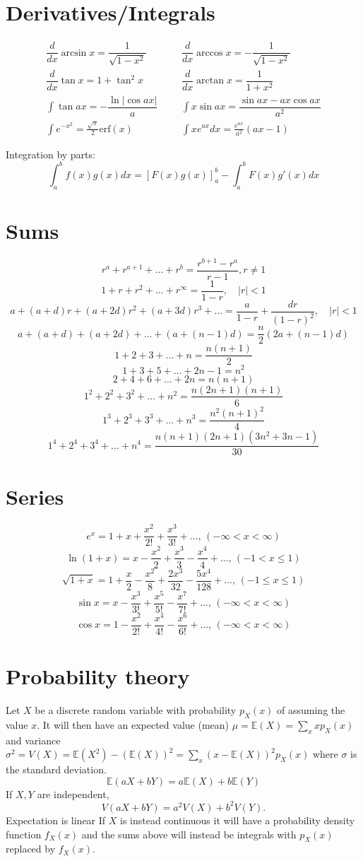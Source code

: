\section{Derivatives/Integrals}
\begin{align*}
	\dfrac{d}{dx}\arcsin x = \dfrac{1}{\sqrt{1-x^2}} &&& \dfrac{d}{dx}\arccos x = -\dfrac{1}{\sqrt{1-x^2}} \\
	\dfrac{d}{dx}\tan x = 1+\tan^2 x &&& \dfrac{d}{dx}\arctan x = \dfrac{1}{1+x^2} \\
	\int\tan ax = -\dfrac{\ln|\cos ax|}{a} &&& \int x\sin ax = \dfrac{\sin ax-ax \cos ax}{a^2} \\
	\int e^{-x^2} = \frac{\sqrt \pi}{2} \text{erf}(x) &&& \int xe^{ax}dx = \frac{e^{ax}}{a^2}(ax-1)
\end{align*}

Integration by parts:
\[\int_a^bf(x)g(x)dx = [F(x)g(x)]_a^b-\int_a^bF(x)g'(x)dx\]

\section{Sums}
	\[ r^a + r^{a+1} + \dots + r^{b} = \frac{r^{b+1} - r^a}{r-1}, r \neq 1 \]
	\[ 1 + r + r^2 + \dots + r^{\infty} = \frac{1}{1-r}, \quad |r| < 1\]
	\[ a + (a+d)r + (a+2d)r^2 + (a+3d)r^3 + \dots = \frac{a}{1-r} + \frac{dr}{(1-r)^2}, \quad |r| < 1\]
	\[ a + (a+d) + (a+2d) + \dots + (a+(n-1)d) = \frac{n}{2} (2a + (n - 1)d)\]
	\[1 + 2 + 3 + \dots + n = \frac{n(n+1)}{2}\]
	\[1 + 3 + 5 + \dots + 2n-1 = n^2\]
	\[2 + 4 + 6 + \dots + 2n = n(n+1)\]
	\[1^2 + 2^2 + 3^2 + \dots + n^2 = \frac{n(2n+1)(n+1)}{6}\]
	\[1^3 + 2^3 + 3^3 + \dots + n^3 = \frac{n^2(n+1)^2}{4}\]
	\[1^4 + 2^4 + 3^4 + \dots + n^4 = \frac{n(n+1)(2n+1)(3n^2 + 3n - 1)}{30} \]

	\section{Series}
	$$e^x = 1+x+\frac{x^2}{2!}+\frac{x^3}{3!}+\dots,\,(-\infty<x<\infty)$$
	$$\ln(1+x) = x-\frac{x^2}{2}+\frac{x^3}{3}-\frac{x^4}{4}+\dots,\,(-1<x\leq1)$$
	$$\sqrt{1+x} = 1+\frac{x}{2}-\frac{x^2}{8}+\frac{2x^3}{32}-\frac{5x^4}{128}+\dots,\,(-1\leq x\leq1)$$
	$$\sin x = x-\frac{x^3}{3!}+\frac{x^5}{5!}-\frac{x^7}{7!}+\dots,\,(-\infty<x<\infty)$$
	$$\cos x = 1-\frac{x^2}{2!}+\frac{x^4}{4!}-\frac{x^6}{6!}+\dots,\,(-\infty<x<\infty)$$

\section{Probability theory}
Let $X$ be a discrete random variable with probability $p_X(x)$ of assuming the value $x$. It will then have an expected value (mean) $\mu=\mathbb{E}(X)=\sum_xxp_X(x)$ and variance $\sigma^2=V(X)=\mathbb{E}(X^2)-(\mathbb{E}(X))^2=\sum_x(x-\mathbb{E}(X))^2p_X(x)$ where $\sigma$ is the standard deviation. 
\[\mathbb{E}(aX+bY) = a\mathbb{E}(X)+b\mathbb{E}(Y)\]
If $X,Y$ are independent, \[V(aX+bY) = a^2V(X)+b^2V(Y).\]
Expectation is linear
If $X$ is instead continuous it will have a probability density function $f_X(x)$ and the sums above will instead be integrals with $p_X(x)$ replaced by $f_X(x)$.


